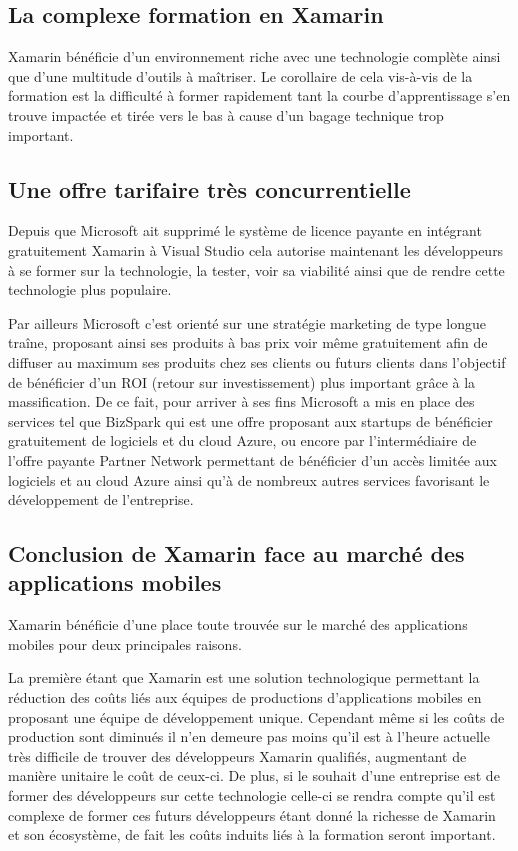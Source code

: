 \documentclass[11]{article}
\begin{document}
\subsection{La complexe formation en Xamarin}
Xamarin bénéficie d’un environnement riche avec une technologie complète ainsi que d’une multitude d’outils à maîtriser. Le corollaire de cela vis-à-vis de la formation est la difficulté à former rapidement tant la courbe d’apprentissage s’en trouve impactée et tirée vers le bas à cause d’un bagage technique trop important.
 
\subsection{Une offre tarifaire très concurrentielle}
 Depuis que Microsoft ait supprimé le système de licence payante en intégrant gratuitement Xamarin à Visual Studio cela autorise maintenant les développeurs à se former sur la technologie, la tester, voir sa viabilité ainsi que de rendre cette technologie plus populaire.
      
\vspace{0.5cm}

Par ailleurs Microsoft c’est orienté sur une stratégie marketing de type longue traîne, proposant ainsi ses produits à bas prix voir même gratuitement afin de diffuser au maximum ses produits chez ses clients ou futurs clients dans l’objectif de bénéficier d’un ROI (retour sur investissement) plus important grâce à la massification. De ce fait, pour arriver à ses fins Microsoft a mis en place des services tel que BizSpark qui est une offre proposant aux startups de bénéficier gratuitement de logiciels et du cloud Azure, ou encore par l’intermédiaire de l’offre payante Partner Network permettant de bénéficier d’un accès limitée aux logiciels et au cloud Azure ainsi qu’à de nombreux autres services favorisant le développement de l’entreprise.

 \subsection{Conclusion de Xamarin face au marché des applications mobiles}
 Xamarin bénéficie d’une place toute trouvée sur le marché des applications mobiles pour deux principales raisons.
       
\vspace{0.5cm}

La première étant que Xamarin est une solution technologique permettant la réduction des coûts liés aux équipes de productions d’applications mobiles en proposant une équipe de développement unique. Cependant même si les coûts de production sont diminués il n’en demeure pas moins qu’il est à l’heure actuelle très difficile de trouver des développeurs Xamarin qualifiés, augmentant de manière unitaire le coût de ceux-ci. De plus, si le souhait d’une entreprise est de former des développeurs sur cette technologie celle-ci se rendra compte qu’il est complexe de former ces futurs développeurs étant donné la richesse de Xamarin et son écosystème, de fait les coûts induits liés à la formation seront important.
       
\end{document}
